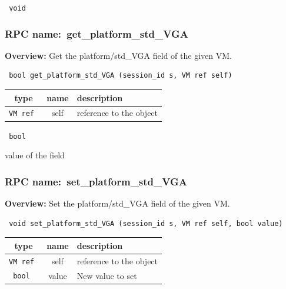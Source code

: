 \vspace{0.3cm}

{\tt 
void
}



\vspace{0.3cm}
\vspace{0.3cm}
\vspace{0.3cm}
\subsubsection{RPC name:~get\_platform\_std\_VGA}

{\bf Overview:} 
Get the platform/std\_VGA field of the given VM.

\begin{verbatim} bool get_platform_std_VGA (session_id s, VM ref self)\end{verbatim}



 
\vspace{0.3cm}
\begin{tabular}{|c|c|p{7cm}|}
 \hline
{\bf type} & {\bf name} & {\bf description} \\ \hline
{\tt VM ref } & self & reference to the object \\ \hline 

\end{tabular}

\vspace{0.3cm}

{\tt 
bool
}


value of the field
\vspace{0.3cm}
\vspace{0.3cm}
\vspace{0.3cm}
\subsubsection{RPC name:~set\_platform\_std\_VGA}

{\bf Overview:} 
Set the platform/std\_VGA field of the given VM.

\begin{verbatim} void set_platform_std_VGA (session_id s, VM ref self, bool value)\end{verbatim}



 
\vspace{0.3cm}
\begin{tabular}{|c|c|p{7cm}|}
 \hline
{\bf type} & {\bf name} & {\bf description} \\ \hline
{\tt VM ref } & self & reference to the object \\ \hline 

{\tt bool } & value & New value to set \\ \hline 

\end{tabular}

